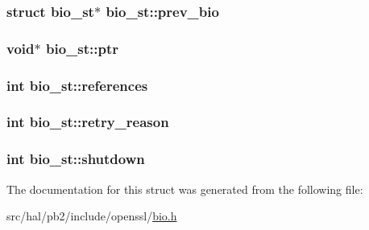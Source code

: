 \subsubsection[{\texorpdfstring{prev\+\_\+bio}{prev_bio}}]{\setlength{\rightskip}{0pt plus 5cm}struct {\bf bio\+\_\+st}$\ast$ bio\+\_\+st\+::prev\+\_\+bio}\hypertarget{structbio__st_a86fd505e8e4af7bb98312d707ee9d170}{}\label{structbio__st_a86fd505e8e4af7bb98312d707ee9d170}
\subsubsection[{\texorpdfstring{ptr}{ptr}}]{\setlength{\rightskip}{0pt plus 5cm}void$\ast$ bio\+\_\+st\+::ptr}\hypertarget{structbio__st_ad59e7884d7949dd931c76ac0d84c2ea5}{}\label{structbio__st_ad59e7884d7949dd931c76ac0d84c2ea5}
\subsubsection[{\texorpdfstring{references}{references}}]{\setlength{\rightskip}{0pt plus 5cm}int bio\+\_\+st\+::references}\hypertarget{structbio__st_a6b72d783529f2185bb1c452ab6845d5e}{}\label{structbio__st_a6b72d783529f2185bb1c452ab6845d5e}
\subsubsection[{\texorpdfstring{retry\+\_\+reason}{retry_reason}}]{\setlength{\rightskip}{0pt plus 5cm}int bio\+\_\+st\+::retry\+\_\+reason}\hypertarget{structbio__st_a4c3a2c24d7c41e8887762750b213e9f0}{}\label{structbio__st_a4c3a2c24d7c41e8887762750b213e9f0}
\subsubsection[{\texorpdfstring{shutdown}{shutdown}}]{\setlength{\rightskip}{0pt plus 5cm}int bio\+\_\+st\+::shutdown}\hypertarget{structbio__st_adafdb3d0f58c31b776525ddceec5068b}{}\label{structbio__st_adafdb3d0f58c31b776525ddceec5068b}


The documentation for this struct was generated from the following file\+:\begin{DoxyCompactItemize}
\item 
src/hal/pb2/include/openssl/\hyperlink{bio_8h}{bio.\+h}\end{DoxyCompactItemize}
